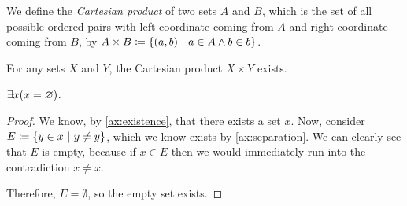 % 
%         
% 
% 
% 

\begin{definition}
    We define the \emph{Cartesian product} of two sets \(A\) and \(B\),
    which is the set of all possible ordered pairs with
    left coordinate coming from \(A\) and right coordinate coming from \(B\),
    by \(A \times B \defn \set*{(a, b) \suchthat a \in A \meet b \in b}\).
\end{definition}

\begin{theorem}
    For any sets \(X\) and \(Y\), the Cartesian product \(X \times Y\) exists.
\end{theorem}

\begin{theorem}
    \(\exists x \pn*{x = \emptyset}\).
\end{theorem}
\begin{proof}
    We know, by \autoref{ax:existence}, that there exists a set \(x\).
    Now, consider \(E \defn \set*{y \in x \suchthat  y \neq y}\),
    which we know exists by \autoref{ax:separation}.
    We can clearly see that \(E\) is empty,
    because if \(x \in E\) then we would immediately run into the contradiction \(x \neq x\).

    Therefore, \(E = \emptyset\), so the empty set exists.
\end{proof}

